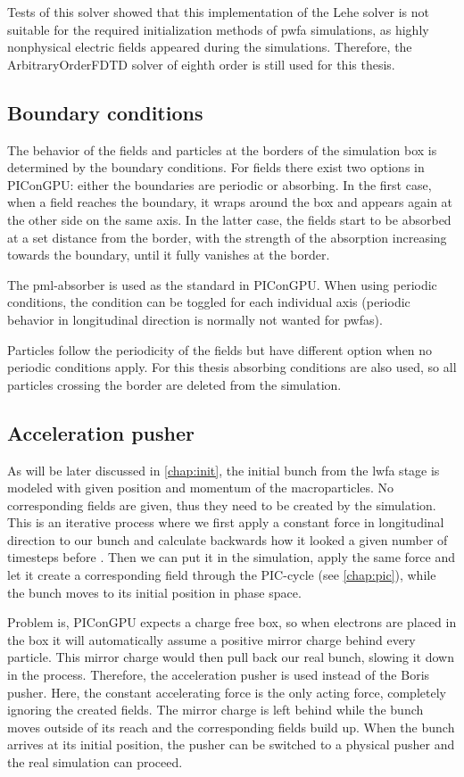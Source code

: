 \documentclass[bachelor_thesis]{subfiles}
\begin{document}
Tests of this solver showed that this implementation of the Lehe solver is not suitable for the required initialization methods of \gls{pwfa} simulations, as highly nonphysical electric fields appeared during the simulations. 
Therefore, the ArbitraryOrderFDTD solver of eighth order is still used for this thesis.


\subsection{Boundary conditions}
The behavior of the fields and particles at the borders of the simulation box is determined by the boundary conditions.
For fields there exist two options in PIConGPU: either the boundaries are periodic or absorbing. In the first case, when a field reaches the boundary, it wraps around the box and appears again at the other side on the same axis.
In the latter case, the fields start to be absorbed at a set distance from the border, with the strength of the absorption increasing towards the boundary, until it fully vanishes at the border.

The \gls{pml}-absorber is used as the standard in PIConGPU. When using periodic conditions, the condition can be toggled for each individual axis (periodic behavior in longitudinal direction is normally not wanted for \gls{pwfa}s).

Particles follow the periodicity of the fields but have different option when no periodic conditions apply. For this thesis absorbing conditions are also used, so all particles crossing the border are deleted from the simulation.

\subsection{Acceleration pusher} \label{chap:accpush}
As will be later discussed in \autoref{chap:init}, the initial bunch from the \gls{lwfa} stage is modeled with given position and momentum of the macroparticles.
No corresponding fields are given, thus they need to be created by the simulation. This is an iterative process where we first apply a constant force in longitudinal direction to our bunch and calculate backwards how it looked a given number of timesteps before \cite{Huebl2014}.
Then we can put it in the simulation, apply the same force and let it create a corresponding field through the PIC-cycle (see \autoref{chap:pic}), while the bunch moves to its initial position in phase space.

Problem is, PIConGPU expects a charge free box, so when electrons are placed in the box it will automatically assume a positive mirror charge behind every particle. This mirror charge would then pull back our real 
bunch, slowing it down in the process. Therefore, the acceleration pusher is used instead of the Boris pusher. Here, the constant accelerating force is the only acting force, completely ignoring the created fields.
The mirror charge is left behind while the bunch moves outside of its reach and the corresponding fields build up. When the bunch arrives at its initial position, the pusher can be switched to a physical pusher and
the real simulation can proceed.
\end{document}
